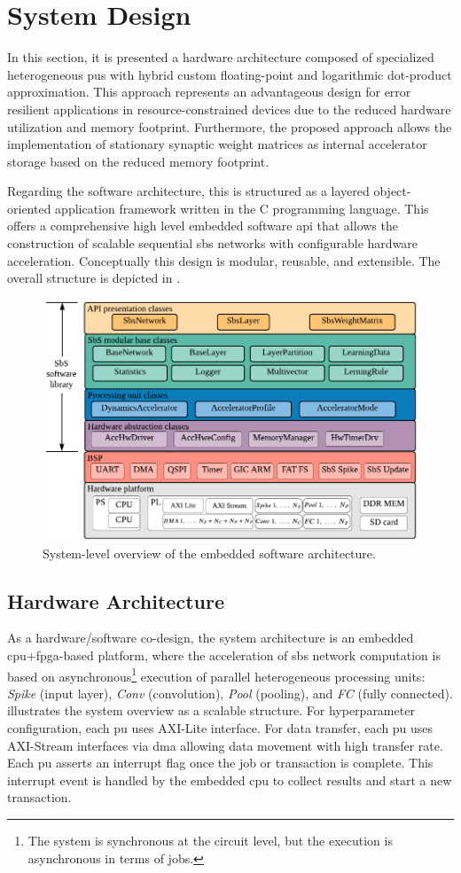 \section{System Design}
\label{sec:system_design}

	In this section, it is presented a hardware architecture composed of specialized heterogeneous \glspl{pu} with hybrid custom floating-point and logarithmic dot-product approximation. This approach represents an advantageous design for error resilient applications in resource-constrained devices due to the reduced hardware utilization and memory footprint. Furthermore, the proposed approach allows the implementation of stationary synaptic weight matrices as internal accelerator storage based on the reduced memory footprint.
	

Regarding the software architecture, this is structured as a
layered object-oriented application framework written in the C programming language. This offers a comprehensive high level embedded software \gls{api} that allows the construction of scalable sequential \gls{sbs} networks with configurable hardware acceleration. Conceptually this design is modular, reusable, and extensible. The overall structure is depicted in .

\begin{figure}[b!]
	\centering
	\includegraphics[width=0.5\columnwidth]{./chapters/sbs_accelerator/figures/sbs_software_component.pdf}
	\caption{System-level overview of the embedded software architecture.}
	\label{fig:sbs_sw_stack}
\end{figure}

\subsection{Hardware Architecture} \label{Hardware_architecture}
As a hardware/software co-design, the system architecture is an embedded \gls{cpu}+\gls{fpga}-based platform, where the acceleration of \gls{sbs} network computation is based on asynchronous\footnote{The system is synchronous at the circuit level, but the execution is asynchronous in terms of jobs.} execution of parallel heterogeneous processing units: \emph{Spike} (input layer), \emph{Conv} (convolution), \emph{Pool} (pooling), and \emph{FC} (fully connected).  illustrates the system overview as a scalable structure. For hyperparameter configuration, each \gls{pu} uses AXI-Lite interface. For data transfer, each \gls{pu} uses AXI-Stream interfaces via \gls{dma} allowing data movement with high transfer rate. Each \gls{pu} asserts an interrupt flag once the job or transaction is complete. This interrupt event is handled by the embedded \gls{cpu} to collect results and start a new transaction.

